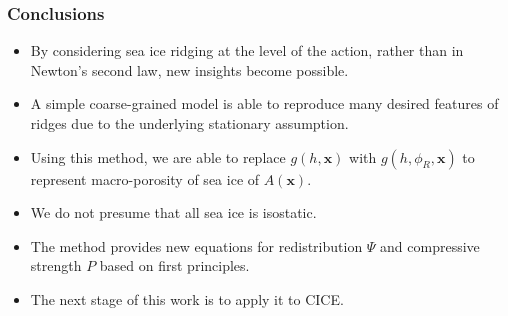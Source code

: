 \documentclass[aspectratio=169,11pt]{beamer}
\begin{document}
\begingroup
{}
\begin{frame}
\frametitle{\color{white} Conclusions}

\begin{itemize}
  \item[\textcolor{white}{\textbullet}] \color{white} By considering sea ice ridging at the level of the action, rather than in Newton's second law, new insights become possible.
  \item[\textcolor{white}{\textbullet}] \color{white} A simple coarse-grained model is able to reproduce many desired features of ridges due to the underlying stationary assumption.
  \item[\textcolor{white}{\textbullet}] \color{white} Using this method, we are able to replace $g(h,\pmb{x})$ with $g(h,\phi_R,\pmb{x})$ to represent macro-porosity of sea ice of $A(\pmb{x})$.
  \item[\textcolor{white}{\textbullet}] \color{white} We do not presume that all sea ice is isostatic.
  \item[\textcolor{white}{\textbullet}] \color{white} The method provides new equations for redistribution $\Psi$ and compressive strength $P$ based on first principles.
  \item[\textcolor{white}{\textbullet}] \color{white} The next stage of this work is to apply it to CICE.
\end{itemize}
\end{frame}
\endgroup
\end{document}
